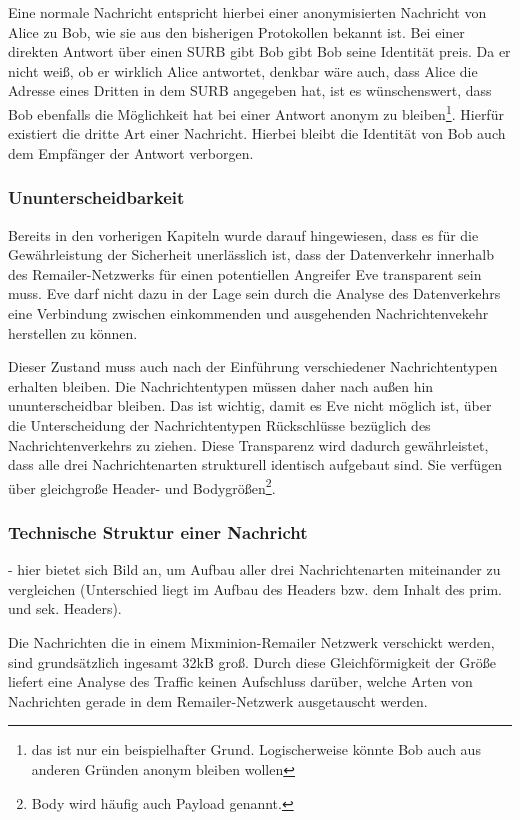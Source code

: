 Eine normale Nachricht entspricht hierbei einer anonymisierten Nachricht von Alice zu Bob, wie sie aus den bisherigen Protokollen bekannt ist. Bei einer direkten Antwort über einen SURB gibt Bob gibt Bob seine Identität preis. Da er nicht weiß, ob er wirklich Alice antwortet, denkbar wäre auch, dass Alice die Adresse eines Dritten in dem SURB angegeben hat, ist es wünschenswert, dass Bob ebenfalls die Möglichkeit hat bei einer Antwort anonym zu bleiben\footnote{das ist nur ein beispielhafter Grund. Logischerweise könnte Bob auch aus anderen Gründen anonym bleiben wollen}. Hierfür existiert die dritte Art einer Nachricht. Hierbei bleibt die Identität von Bob auch dem Empfänger der Antwort verborgen.

\subsubsection{Ununterscheidbarkeit}
Bereits in den vorherigen Kapiteln wurde darauf hingewiesen, dass es für die Gewährleistung der Sicherheit unerlässlich ist, dass der Datenverkehr innerhalb des Remailer-Netzwerks für einen potentiellen Angreifer Eve transparent sein muss. Eve darf nicht dazu in der Lage sein durch die Analyse des Datenverkehrs eine Verbindung zwischen einkommenden und ausgehenden Nachrichtenvekehr herstellen zu können.

Dieser Zustand muss auch nach der Einführung verschiedener Nachrichtentypen erhalten bleiben.  Die Nachrichtentypen müssen daher nach außen hin ununterscheidbar bleiben. Das ist wichtig, damit es Eve nicht möglich ist, über die Unterscheidung der Nachrichtentypen Rückschlüsse bezüglich des Nachrichtenverkehrs zu ziehen. Diese Transparenz wird dadurch gewährleistet, dass alle drei Nachrichtenarten strukturell identisch aufgebaut sind. Sie verfügen über gleichgroße Header- und Bodygrößen\footnote{Body wird häufig auch Payload genannt.}.

\subsubsection{Technische Struktur einer Nachricht}
- hier bietet sich Bild an, um Aufbau aller drei Nachrichtenarten miteinander zu vergleichen (Unterschied liegt im Aufbau des Headers bzw. dem Inhalt des prim. und sek. Headers).

Die Nachrichten die in einem Mixminion-Remailer Netzwerk verschickt werden, sind grundsätzlich ingesamt 32kB groß. Durch diese Gleichförmigkeit der Größe liefert eine Analyse des Traffic keinen Aufschluss darüber, welche Arten von Nachrichten gerade in dem Remailer-Netzwerk ausgetauscht werden.

